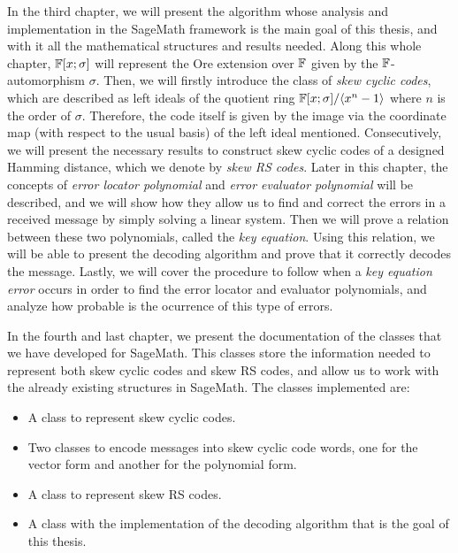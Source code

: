 In the third chapter, we will present the algorithm whose analysis and implementation in the SageMath framework is the main goal of this thesis, and with it all the mathematical structures and results needed. Along this whole chapter, \(\mathbb{F}[x;\sigma]\) will represent the Ore extension over \(\mathbb{F}\) given by the  \(\mathbb{F}\)-automorphism \(\sigma\). Then, we will firstly introduce the class of \textit{skew cyclic codes}, which are described as left ideals of the quotient ring \(\mathbb{F}[x;\sigma] / \langle x^{n} - 1 \rangle\) where \(n\) is the order of \(\sigma\). Therefore, the code itself is given by the image via the coordinate map (with respect to the usual basis) of the left ideal mentioned. Consecutively, we will present the necessary results to construct skew cyclic codes of a designed Hamming distance, which we denote by \textit{skew RS codes}. Later in this chapter, the concepts of \textit{error locator polynomial} and \textit{error evaluator polynomial} will be described, and we will show how they allow us to find and correct the errors in a received message by simply solving a linear system. Then we will prove a relation between these two polynomials, called the \textit{key equation}. Using this relation, we will be able to present the decoding algorithm and prove that it correctly decodes the message. Lastly, we will cover the procedure to follow when a \textit{key equation error} occurs in order to find the error locator and evaluator polynomials, and analyze how probable is the ocurrence of this type of errors.

In the fourth and last chapter, we present the documentation of the classes that we have developed for SageMath. This classes store the information needed to represent both skew cyclic codes and skew RS codes, and allow us to work with the already existing structures in SageMath. The classes implemented are:

\begin{itemize}
    \item A class to represent skew cyclic codes.
    \item Two classes to encode messages into skew cyclic code words, one for the vector form and another for the polynomial form.
    \item A class to represent skew RS codes.
    \item A class with the implementation of the decoding algorithm that is the goal of this thesis.
\end{itemize}

\endinput
